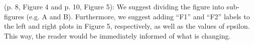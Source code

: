 
\begin{point}{}
(p. 8, Figure 4 and p. 10, Figure 5): We suggest dividing the figure into sub-figures (e.g. A and B). Furthermore, we suggest adding ``F1'' and ``F2'' labels to the left and right plots in Figure 5, respectively, as well as the values of epsilon. This way, the reader would be immediately informed of what is changing.
\end{point}


